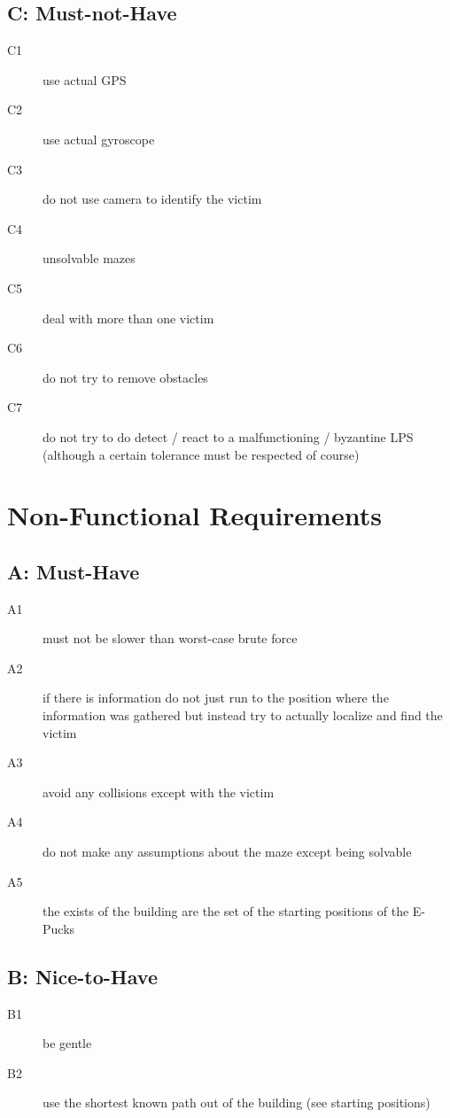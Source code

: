 \documentclass[a4paper,parskip,headheight=38pt]{scrartcl} %
\begin{document}
\subsection*{C: Must-not-Have}
\begin{description}
\item[C1] use actual GPS
\item[C2] use actual gyroscope
\item[C3] do not use camera to identify the victim
\item[C4] unsolvable mazes
\item[C5] deal with more than one victim
\item[C6] do not try to remove obstacles
\item[C7] do not try to do detect / react to a malfunctioning / byzantine LPS (although a certain tolerance must be respected of course)
\end{description}

\section{Non-Functional Requirements}
\subsection*{A: Must-Have}
\begin{description}
\item[A1] must not be slower than worst-case brute force
\item[A2] if there is information do not just run to the position where the information was gathered but instead try to actually localize and find the victim
\item[A3] avoid any collisions except with the victim
\item[A4] do not make any assumptions about the maze except being solvable
\item[A5] the exists of the building are the set of the starting positions of the E-Pucks
\end{description}

\subsection*{B: Nice-to-Have}
\begin{description}
\item[B1] be gentle
\item[B2] use the shortest known path out of the building (see starting positions)
\end{description}
\end{document}
